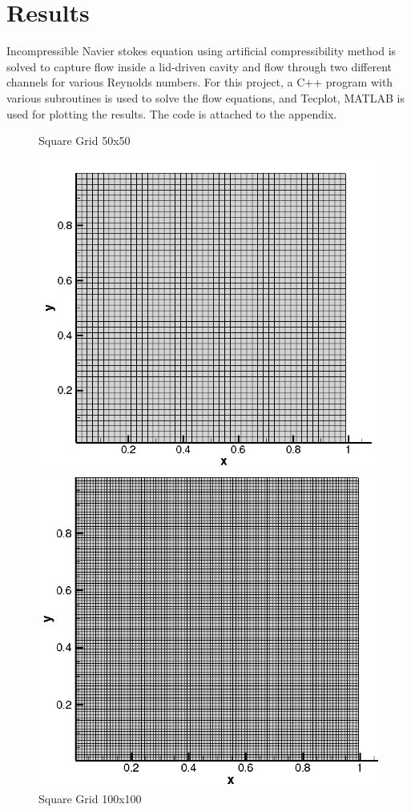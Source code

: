 \documentclass[12pt]{elsarticle}
\begin{document}
	
	\section{Results}
	Incompressible Navier stokes equation using artificial compressibility method is solved to capture flow inside a lid-driven cavity and flow through two different channels for various Reynolds numbers. For this project, a C++ program with various subroutines is used to solve the flow equations, and Tecplot, MATLAB is used for plotting the results. The code is attached to the appendix.\\
	
	\begin{figure}[h]
		\caption{Square Grid 50x50}
		\centering\includegraphics[width=0.7\linewidth]{grid_50_50.png}
		\caption{Square Grid 100x100}
		\centering\includegraphics[width=0.7\linewidth]{grid_100_100.png}
	\end{figure}
	\clearpage
	
\end{document}
